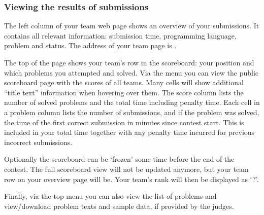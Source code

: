 \documentclass[a4paper,10pt,english,openany]{sphinxmanual}
\begin{document}
\subsubsection{Viewing the results of submissions}
\label{\detokenize{team:viewing-the-results-of-submissions}}
\sphinxAtStartPar
The left column of your team web page shows an overview of your submissions.
It contains all relevant information: submission time, programming
language, problem and status. The address of your team page is
.

\sphinxAtStartPar
The top of the page shows your team’s row in the scoreboard: your position and
which problems you attempted and solved. Via the menu you can view the public
scoreboard page with the scores of all teams. Many cells will show
additional “title text” information when hovering over them. The
score column lists the number of solved problems and the total time including
penalty time. Each cell in a problem column lists the number of submissions,
and if the problem was solved, the time of the first correct
submission in minutes since contest start. This is included in your
total time together with any penalty time incurred for previous
incorrect submissions.

\sphinxAtStartPar
Optionally the scoreboard can be ‘frozen’ some time before the end of the
contest. The full scoreboard view will not be updated anymore, but your
team row on your overview page will be. Your team’s rank will then be
displayed as ‘?’.

\sphinxAtStartPar
Finally, via the top menu you can also view the list of problems and
view/download problem texts and sample data, if provided by the judges.
\end{document}
